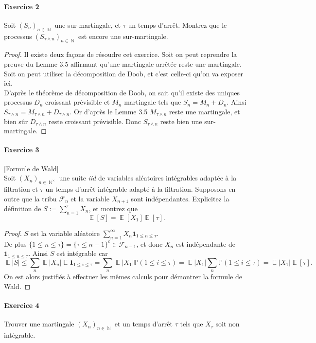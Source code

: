 \documentclass{article}
\theoremstyle{definition}
\numberwithin{equation}{section}
\DeclareMathOperator{\N}{\mathbb{N}}
\DeclareMathOperator{\E}{\mathbb{E}}
\begin{document}
\paragraph{Exercice 2} 
Soit $(S_n)_{n\in \N}$ une sur-martingale, et $\tau$ un temps d'arrêt. Montrez que le processus $(S_{\tau\wedge n})_{n\in \N}$ est encore une sur-martingale.

\begin{proof}
Il existe deux façons de résoudre cet exercice. Soit on peut reprendre la preuve du Lemme 3.5 affirmant qu'une martingale arrêtée reste une martingale. Soit on peut utiliser la décomposition de Doob, et c'est celle-ci qu'on va exposer ici.\\
D'après le théorème de décomposition de Doob, on sait qu'il existe des uniques processus $D_n$ croissant prévisible et $M_n$ martingale tels que $S_n = M_n + D_n$. Ainsi $S_{\tau\wedge n} = M_{\tau\wedge n} + D_{\tau\wedge n}$. Or d'après le Lemme 3.5 $M_{\tau\wedge n}$ reste une martingale, et bien sûr $D_{\tau\wedge n}$ reste croissant prévisible. Donc $S_{\tau\wedge n}$ reste bien une sur-martingale.
\end{proof}


\paragraph{Exercice 3}[Formule de Wald]~\\
Soit $(X_n)_{n\in\N^\times}$ une suite \textit{iid} de variables aléatoires intégrables adaptée à la filtration et $\tau$ un temps d'arrêt intégrable adapté à la filtration. Supposons en outre que la tribu $\mathcal{F}_n$ et la variable $X_{n+1}$ sont indépendantes. Explicitez la définition de $S:=\sum_{n=1}^\tau X_n$, et montrez que
$$\E[S]=\E[X_1]\E[\tau].$$

\begin{proof}
$S$ est la variable aléatoire $\sum_{n=1}^\infty X_n \mathbf{1}_{1\leq n\leq\tau}$.\\
De plus $\{1\leq n\leq\tau\}=\{\tau\leq n-1\}^c \in \mathcal{F}_{n-1}$, et donc $X_n$ est indépendante de $\mathbf{1}_{1\leq n\leq\tau}$. Ainsi $S$ est intégrable car 
$$\E|S|\leq \sum_n \E|X_n|\E\mathbf{1}_{1\leq i\leq\tau} = \sum_n \E|X_1|\mathbb{P}(1\leq i\leq\tau)=\E|X_1|\sum_n\mathbb{P}(1\leq i\leq\tau)=\E|X_1|\E[\tau].$$
On est alors justifiés à effectuer les mêmes calculs pour démontrer la formule de Wald.
\end{proof}


\paragraph{Exercice 4}
Trouver une martingale $(X_n)_{n\in \N}$ et un temps d'arrêt $\tau$ tels que $X_\tau$ soit non intégrable.
\end{document}
